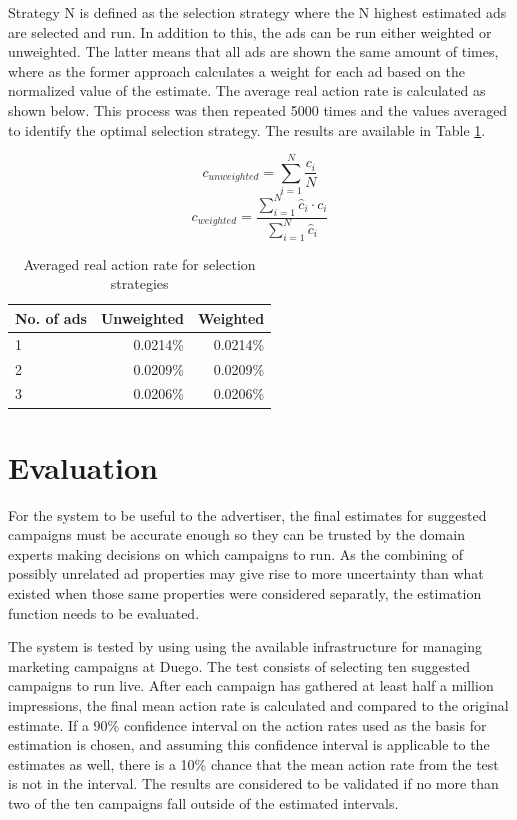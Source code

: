 \documentclass[11pt,a4paper]{report}
\begin{document}
Strategy N is defined as the selection strategy where the N highest estimated ads are selected and run. In addition to this, the ads can be run either weighted or unweighted. The latter means that all ads are shown the same amount of times, where as the former approach calculates a weight for each ad based on the normalized value of the estimate. The average real action rate is calculated as shown below. This process was then repeated 5000 times and the values averaged to identify the optimal selection strategy. The results are available in Table \ref{tbl:SelectionStrategy}.

\[
	c_{unweighted} = \sum_{i=1}^{N} \frac{ c_i }{ N }
\]
\[
	c_{weighted} = \frac{ \sum_{i=1}^{N} \hat{c}_i \cdot c_i }{ \sum_{i=1}^{N} \hat{c}_i }
\]

\begin{table}
\begin{center}
	\begin{tabular}{  l | r  r  }
		\hline
		\textbf{No. of ads} & \textbf{Unweighted} & \textbf{Weighted} \\
		\hline
		1 & 0.0214\% & 0.0214\% \\
		2 & 0.0209\% & 0.0209\% \\
		3 & 0.0206\% & 0.0206\% \\
		\hline
	\end{tabular}
	\caption{Averaged real action rate for selection strategies}
	\label{tbl:SelectionStrategy}
\end{center}
\end{table}

\section{Evaluation}
For the system to be useful to the advertiser, the final estimates for suggested campaigns must be accurate enough so they can be trusted by the domain experts making decisions on which campaigns to run. As the combining of possibly unrelated ad properties may give rise to more uncertainty than what existed when those same properties were considered separatly, the estimation function needs to be evaluated.

The system is tested by using using the available infrastructure for managing marketing campaigns at Duego. The test consists of selecting ten suggested campaigns to run live. After each campaign has gathered at least half a million impressions, the final mean action rate is calculated and compared to the original estimate. If a 90\% confidence interval on the action rates used as the basis for estimation is chosen, and assuming this confidence interval is applicable to the estimates as well, there is a 10\% chance that the mean action rate from the test is not in the interval. The results are considered to be validated if no more than two of the ten campaigns fall outside of the estimated intervals.
\end{document}
